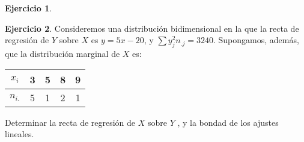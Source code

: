 \documentclass[a4paper, 12pt]{article}
\theoremstyle{definition}
\newtheorem{ej}{Ejercicio}
\begin{document}
\begin{ej}
\end{ej}

\begin{ej}
Consideremos una distribución bidimensional en la que la recta de regresión de $Y$ sobre $X$ es $y=5x-20$, y $\sum y_j^2n_{.j} = 3240$. Supongamos, además, que la distribución marginal de $X$ es:

\begin{center}
\begin{tabular}{c|cccc}
    $x_i$ & 3 & 5 & 8 & 9 \\
    \hline
    $n_{i.}$ & 5 & 1 & 2 & 1 
\end{tabular}
\end{center}

Determinar la recta de regresión de $X$ sobre $Y$ , y la bondad de los ajustes lineales.


\end{ej}
\end{document}
